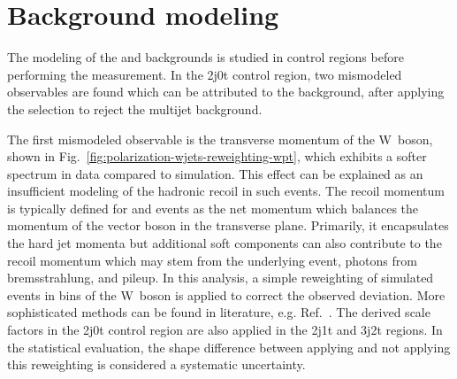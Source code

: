 

\section{Background modeling}
\label{sec:polarization-modeling}

The modeling of the \wjets and \ttbar backgrounds is studied in control regions before performing the measurement. In the 2j0t control region, two mismodeled observables are found which can be attributed to the \wjets background, after applying the \bdtqcd selection to reject the multijet background. 

The first mismodeled observable is the transverse momentum of the W~boson, shown in Fig.~\ref{fig:polarization-wjets-reweighting-wpt}, which exhibits a softer spectrum in data compared to simulation. This effect can be explained as an insufficient modeling of the hadronic recoil in such events. The recoil momentum is typically defined for \zjets and \wjets events as the net momentum which balances the momentum of the vector boson in the transverse plane. Primarily, it encapsulates the hard jet momenta but additional soft components can also contribute to the recoil momentum which may stem from the underlying event, photons from bremsstrahlung, and pileup. In this analysis, a simple reweighting of simulated \wjets events in bins of the W~boson \pt is applied to correct the observed deviation. More sophisticated methods can be found in literature, e.g. Ref.~\cite{Abazov:2009tra}. The derived scale factors in the 2j0t control region are also applied in the 2j1t and 3j2t regions. In the statistical evaluation, the shape difference between applying and not applying this reweighting is considered a systematic uncertainty.

